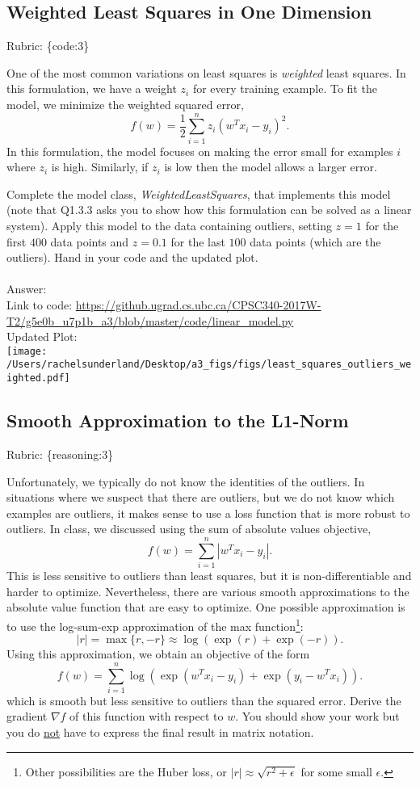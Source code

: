 \documentclass{article}
\def\rubric#1{\gre{Rubric: \{#1\}}}{}
\def\blu#1{{\color{blu}#1}}
\def\gre#1{{\color{gre}#1}}
\begin{document}
\subsection{Weighted Least Squares in One Dimension}
\rubric{code:3}

One of the most common variations on least squares is \emph{weighted} least squares. In this formulation, we have a weight $z_i$ for every training example. To fit the model, we minimize the weighted squared error,
\[
f(w) =  \frac{1}{2}\sum_{i=1}^n z_i(w^Tx_i - y_i)^2.
\]
In this formulation, the model focuses on making the error small for examples $i$ where $z_i$ is high. Similarly, if $z_i$ is low then the model allows a larger error.

Complete the model class, \emph{WeightedLeastSquares}, that implements this model
(note that Q1.3.3 asks you to show how this formulation can be solved as a linear system).
Apply this model to the data containing outliers, setting $z = 1$ for the first
$400$ data points and $z = 0.1$ for the last $100$ data points (which are the outliers).
\blu{Hand in your code and the updated plot}.
\\
\\ \gre {Answer: }
\\ \gre{Link to code:} \url{https://github.ugrad.cs.ubc.ca/CPSC340-2017W-T2/g5e0b_u7p1b_a3/blob/master/code/linear_model.py}
\\ \gre{Updated Plot: }
\\ \texttt{[image: /Users/rachelsunderland/Desktop/a3\_figs/figs/least\_squares\_outliers\_weighted.pdf]}

\subsection{Smooth Approximation to the L1-Norm}
\rubric{reasoning:3}

Unfortunately, we typically do not know the identities of the outliers. In situations where we suspect that there are outliers, but we do not know which examples are outliers, it makes sense to use a loss function that is more robust to outliers. In class, we discussed using the sum of absolute values objective,
\[
f(w) = \sum_{i=1}^n |w^Tx_i - y_i|.
\]
This is less sensitive to outliers than least squares, but it is non-differentiable and harder to optimize. Nevertheless, there are various smooth approximations to the absolute value function that are easy to optimize. One possible approximation is to use the log-sum-exp approximation of the max function\footnote{Other possibilities are the Huber loss, or $|r|\approx \sqrt{r^2+\epsilon}$ for some small $\epsilon$.}:
\[
|r| = \max\{r, -r\} \approx \log(\exp(r) + \exp(-r)).
\]
Using this approximation, we obtain an objective of the form
\[
f(w) {=} \sum_{i=1}^n  \log\left(\exp(w^Tx_i - y_i) + \exp(y_i - w^Tx_i)\right).
\]
which is smooth but less sensitive to outliers than the squared error. \blu{Derive
 the gradient $\nabla f$ of this function with respect to $w$. You should show your work but you do \underline{not} have to express the final result in matrix notation.}
\end{document}
